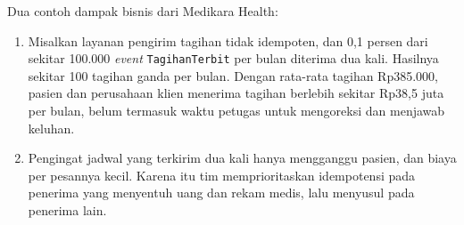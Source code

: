 Dua contoh dampak bisnis dari Medikara Health:
\begin{enumerate}
  \item Misalkan layanan pengirim tagihan tidak idempoten, dan 0,1 persen dari sekitar 100.000
        \textit{event} \texttt{TagihanTerbit} per bulan diterima dua kali. Hasilnya sekitar 100
        tagihan ganda per bulan. Dengan rata-rata tagihan Rp385.000, pasien dan perusahaan klien
        menerima tagihan berlebih sekitar Rp38,5 juta per bulan, belum termasuk waktu petugas
        untuk mengoreksi dan menjawab keluhan.
  \item Pengingat jadwal yang terkirim dua kali hanya mengganggu pasien, dan biaya per pesannya
        kecil. Karena itu tim memprioritaskan idempotensi pada penerima yang menyentuh uang dan
        rekam medis, lalu menyusul pada penerima lain.
\end{enumerate}

